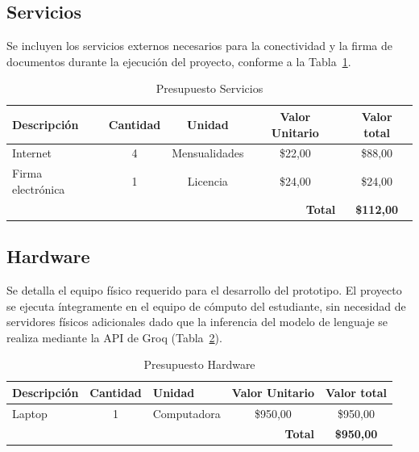 \subsection{Servicios}

Se incluyen los servicios externos necesarios para la conectividad y la firma de documentos durante la ejecución del proyecto, conforme a la Tabla~\ref{tab:presupuesto-servicios}.

\begin{table}[H]
\centering
\caption{Presupuesto Servicios}
\label{tab:presupuesto-servicios}
\begin{tabular}{|l|c|c|c|c|}
\hline
\rowcolor[HTML]{B6DAF8}
\textbf{Descripción} & \textbf{Cantidad} & \textbf{Unidad} & \textbf{Valor Unitario} & \textbf{Valor total} \\ \hline
Internet             & 4                 & Mensualidades   & \$22,00                  & \$88,00               \\ \hline
Firma electrónica    & 1                 & Licencia        & \$24,00                  & \$24,00               \\ \hline
\multicolumn{4}{|r|}{\textbf{Total}}                          & \textbf{\$112,00}     \\ \hline
\end{tabular}
\end{table}

\subsection{Hardware}

Se detalla el equipo físico requerido para el desarrollo del prototipo. El proyecto se ejecuta íntegramente en el equipo de cómputo del estudiante, sin necesidad de servidores físicos adicionales dado que la inferencia del modelo de lenguaje se realiza mediante la API de Groq (Tabla~\ref{tab:presupuesto-hardware}).

\begin{table}[H]
\centering
\caption{Presupuesto Hardware}
\label{tab:presupuesto-hardware}
\begin{tabular}{|l|c|l|c|c|}
\hline
\rowcolor[HTML]{B6DAF8}
\textbf{Descripción} & \textbf{Cantidad} & \textbf{Unidad} & \textbf{Valor Unitario} & \textbf{Valor total} \\ \hline
Laptop               & 1                 & Computadora     & \$950,00                 & \$950,00              \\ \hline
\multicolumn{4}{|r|}{\textbf{Total}}                          & \textbf{\$950,00}     \\ \hline
\end{tabular}
\end{table}

